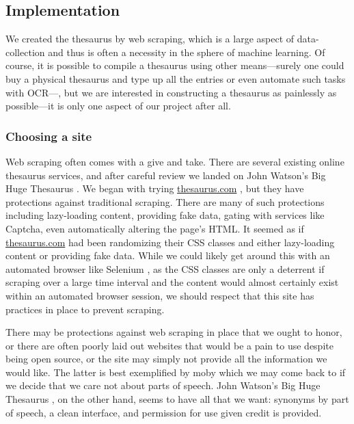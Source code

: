 \documentclass[11pt, twoside, reqno]{book}
\begin{document}
\subsection{Implementation}

We created the thesaurus by web scraping, which is a large aspect of data-collection and thus is often a necessity in the sphere of machine learning. Of course, it is possible to compile a thesaurus using other means—surely one could buy a physical thesaurus and type up all the entries or even automate such tasks with OCR—, but we are interested in constructing a thesaurus as painlessly as possible—it is only one aspect of our project after all.

\subsubsection{Choosing a site}

Web scraping often comes with a give and take. There are several existing online thesaurus services, and after careful review we landed on John Watson's Big Huge Thesaurus \cite{BigHugeT88:online}. We began with trying \href{https://www.thesaurus.com}{thesaurus.com} \cite{Thesauru2:online}, but they have protections against traditional scraping. There are many of such protections including lazy-loading content, providing fake data, gating with services like Captcha, even automatically altering the page's HTML. It seemed as if \href{https://www.thesaurus.com}{thesaurus.com} had been randomizing their CSS classes and either lazy-loading content or providing fake data. While we could likely get around this with an automated browser like Selenium \cite{Selenium25:online}, as the CSS classes are only a deterrent if scraping over a large time interval and the content would almost certainly exist within an automated browser session, we should respect that this site has practices in place to prevent scraping.

There may be protections against web scraping in place that we ought to honor, or there are often poorly laid out websites that would be a pain to use despite being open source, or the site may simply not provide all the information we would like. The latter is best exemplified by moby \cite{MobyThes97:online} which we may come back to if we decide that we care not about parts of speech. John Watson's Big Huge Thesaurus \cite{BigHugeT88:online}, on the other hand, seems to have all that we want: synonyms by part of speech, a clean interface, and permission for use given credit is provided. \cite{HowToPre29:online}
\end{document}
